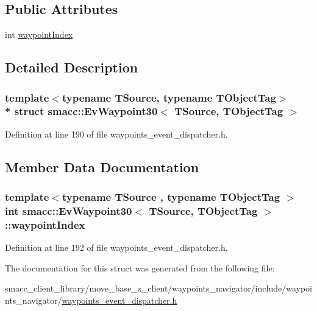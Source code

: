 \subsection*{Public Attributes}
\begin{DoxyCompactItemize}
\item 
int \hyperlink{structsmacc_1_1EvWaypoint30_a0ebbaad00d716f2208026146e86238eb}{waypoint\+Index}
\end{DoxyCompactItemize}


\subsection{Detailed Description}
\subsubsection*{template$<$typename T\+Source, typename T\+Object\+Tag$>$\\*
struct smacc\+::\+Ev\+Waypoint30$<$ T\+Source, T\+Object\+Tag $>$}



Definition at line 190 of file waypoints\+\_\+event\+\_\+dispatcher.\+h.



\subsection{Member Data Documentation}
\subsubsection[{\texorpdfstring{waypoint\+Index}{waypointIndex}}]{\setlength{\rightskip}{0pt plus 5cm}template$<$typename T\+Source , typename T\+Object\+Tag $>$ int {\bf smacc\+::\+Ev\+Waypoint30}$<$ T\+Source, T\+Object\+Tag $>$\+::waypoint\+Index}\hypertarget{structsmacc_1_1EvWaypoint30_a0ebbaad00d716f2208026146e86238eb}{}\label{structsmacc_1_1EvWaypoint30_a0ebbaad00d716f2208026146e86238eb}


Definition at line 192 of file waypoints\+\_\+event\+\_\+dispatcher.\+h.



The documentation for this struct was generated from the following file\+:\begin{DoxyCompactItemize}
\item 
smacc\+\_\+client\+\_\+library/move\+\_\+base\+\_\+z\+\_\+client/waypoints\+\_\+navigator/include/waypoints\+\_\+navigator/\hyperlink{waypoints__event__dispatcher_8h}{waypoints\+\_\+event\+\_\+dispatcher.\+h}\end{DoxyCompactItemize}
